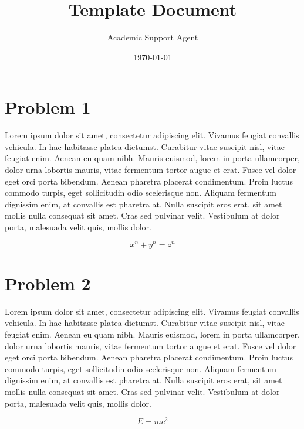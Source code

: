 \documentclass{article}
\title{Template Document}
\author{Academic Support Agent}
\date{\today}
\begin{document}
\maketitle

\makecover

\section*{Problem 1}
Lorem ipsum dolor sit amet, consectetur adipiscing elit. Vivamus feugiat convallis vehicula. In hac habitasse platea dictumst. Curabitur vitae suscipit nisl, vitae feugiat enim. Aenean eu quam nibh. Mauris euismod, lorem in porta ullamcorper, dolor urna lobortis mauris, vitae fermentum tortor augue et erat. Fusce vel dolor eget orci porta bibendum. Aenean pharetra placerat condimentum. Proin luctus commodo turpis, eget sollicitudin odio scelerisque non. Aliquam fermentum dignissim enim, at convallis est pharetra at. Nulla suscipit eros erat, sit amet mollis nulla consequat sit amet. Cras sed pulvinar velit. Vestibulum at dolor porta, malesuada velit quis, mollis dolor.

\[ x^n + y^n = z^n \]

\section*{Problem 2}
Lorem ipsum dolor sit amet, consectetur adipiscing elit. Vivamus feugiat convallis vehicula. In hac habitasse platea dictumst. Curabitur vitae suscipit nisl, vitae feugiat enim. Aenean eu quam nibh. Mauris euismod, lorem in porta ullamcorper, dolor urna lobortis mauris, vitae fermentum tortor augue et erat. Fusce vel dolor eget orci porta bibendum. Aenean pharetra placerat condimentum. Proin luctus commodo turpis, eget sollicitudin odio scelerisque non. Aliquam fermentum dignissim enim, at convallis est pharetra at. Nulla suscipit eros erat, sit amet mollis nulla consequat sit amet. Cras sed pulvinar velit. Vestibulum at dolor porta, malesuada velit quis, mollis dolor.

\[E=mc^2\]
\end{document}
